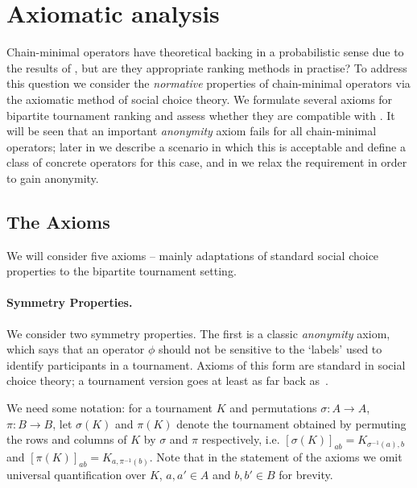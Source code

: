 \section{Axiomatic analysis}
\label{tourn_sec_axiomatic_analysis}

Chain-minimal operators have theoretical backing in a probabilistic sense due
to the results of , but are they appropriate ranking methods in
practise? To address this question we consider the \emph{normative} properties
of chain-minimal operators via the axiomatic method of social choice theory. We
formulate several axioms for bipartite tournament ranking
and assess whether they
are compatible with . It will be seen that an important
\emph{anonymity} axiom fails for all chain-minimal operators; later in
 we describe a scenario in which this is
acceptable and define a class of concrete operators for this case, and in
 we relax the  requirement in
order to gain anonymity.

\subsection{The Axioms}

We will consider five axioms -- mainly adaptations of standard social choice
properties to the bipartite tournament setting.

\paragraph{Symmetry Properties.}
%
We consider two symmetry properties. The first is a classic \emph{anonymity}
axiom, which says that an operator $\phi$ should not be sensitive to the
`labels' used to identify participants in a tournament. Axioms of this form are
standard in social choice theory; a tournament version goes at least as far
back as~\cite{rubinstein1980ranking}.

We need some notation: for a tournament $K$ and permutations $\sigma: A \to A$,
$\pi: B \to B$, let $\sigma(K)$ and $\pi(K)$ denote the tournament obtained by
permuting the rows and columns of $K$ by $\sigma$ and $\pi$ respectively, i.e.
$[\sigma(K)]_{ab} = K_{\sigma^{-1}(a), b}$ and $[\pi(K)]_{ab} = K_{a,
\pi^{-1}(b)}$. Note that in the statement of the axioms we omit universal
quantification over $K$, $a, a' \in A$ and $b, b' \in B$ for
brevity.


